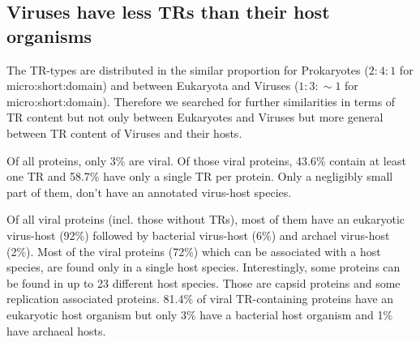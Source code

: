 \documentclass[a4,center,fleqn]{NAR}
\begin{document}
\subsection{Viruses have less TRs than their host organisms}
The TR-types are distributed in the similar proportion for Prokaryotes ($2:4:1$ for micro:short:domain) and between Eukaryota and Viruses ($1:3:\sim 1$ for micro:short:domain). 
Therefore we searched for further similarities in terms of TR content but not only between Eukaryotes and Viruses but more general between TR content of Viruses and their hosts.

Of all proteins, only 3\% are viral. Of those viral proteins, 43.6\% contain at least one TR and 58.7\% have only a single TR per protein. Only a negligibly small part of them, don't have an annotated virus-host species. 

Of all viral proteins (incl. those without TRs), most of them have an eukaryotic virus-host (92\%) followed by bacterial virus-host (6\%) and archael virus-host (2\%).
Most of the viral proteins (72\%) which can be associated with a host species, are found only in a single host species. Interestingly, some proteins can be found in up to 23 different host species. Those are capsid proteins and some replication associated proteins.
81.4\% of viral TR-containing proteins have an eukaryotic host organism but only 3\% have a bacterial host organism and 1\% have archaeal hosts.
\end{document}
